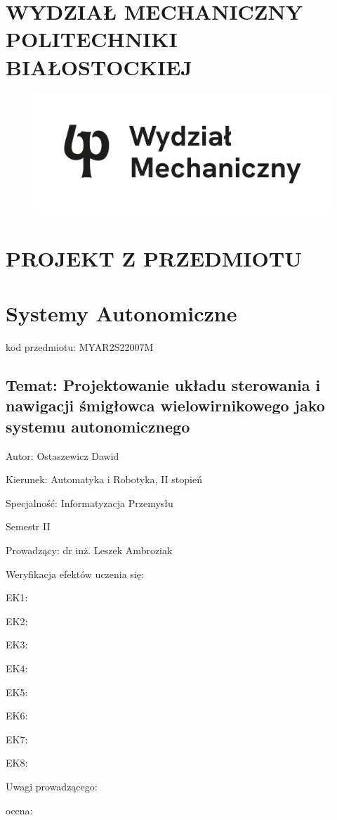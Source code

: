 \documentclass[polish,11pt,a4paper]{article}
\begin{document}
	\centering
	\section*{WYDZIAŁ MECHANICZNY POLITECHNIKI BIAŁOSTOCKIEJ}
	\begin{figure}
		\centering
		\includegraphics[width=0.4\linewidth]{logo}
		\label{fig:logo}
	\end{figure}
	
	\section*{PROJEKT Z PRZEDMIOTU}
	\section*{Systemy Autonomiczne}
	\large
	kod przedmiotu: MYAR2S22007M
	\subsection*{Temat: Projektowanie układu sterowania i nawigacji
		śmigłowca wielowirnikowego jako systemu
		autonomicznego }
	\vspace{1cm}
	\raggedright
	Autor: Ostaszewicz Dawid
	
	Kierunek: Automatyka i Robotyka, II stopień
	
	Specjalność: Informatyzacja Przemysłu
	
	Semestr II
	
	Prowadzący: dr inż. Leszek Ambroziak
	\vspace{1cm}
	
	Weryfikacja efektów uczenia się:
	
	EK1: \dotso
	
	EK2: \dotso
	
	EK3: \dotso
	
	EK4: \dotso
	
	EK5: \dotso
	
	EK6: \dotso
	
	EK7: \dotso
	
	EK8: \dotso
	
	Uwagi prowadzącego:
	\vspace{2cm}
	
	ocena: \dotso
	\clearpage
	
\end{document}
